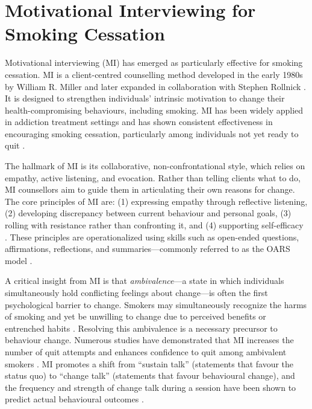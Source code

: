 \section{Motivational Interviewing for Smoking Cessation}

Motivational interviewing (MI) has emerged as particularly effective for smoking cessation. MI is a client-centred counselling method developed in the early 1980s by William R. Miller and later expanded in collaboration with Stephen Rollnick \cite{miller1991motivational,MillerRollnick2023}. It is designed to strengthen individuals' intrinsic motivation to change their health-compromising behaviours, including smoking. MI has been widely applied in addiction treatment settings and has shown consistent effectiveness in encouraging smoking cessation, particularly among individuals not yet ready to quit \cite{bischof2021evidence,doi:10.1177/1049731509347850}.

The hallmark of MI is its collaborative, non-confrontational style, which relies on empathy, active listening, and evocation. Rather than telling clients what to do, MI counsellors aim to guide them in articulating their own reasons for change. The core principles of MI are: (1) expressing empathy through reflective listening, (2) developing discrepancy between current behaviour and personal goals, (3) rolling with resistance rather than confronting it, and (4) supporting self-efficacy \cite{rollnick2008motivational}. These principles are operationalized using skills such as open-ended questions, affirmations, reflections, and summaries---commonly referred to as the OARS model \cite{Miller_2023}.


A critical insight from MI is that \emph{ambivalence}---a state in which individuals simultaneously hold conflicting feelings about change---is often the first psychological barrier to change. Smokers may simultaneously recognize the harms of smoking and yet be unwilling to change due to perceived benefits or entrenched habits \cite{brown2023mi}. Resolving this ambivalence is a necessary precursor to behaviour change. Numerous studies have demonstrated that MI increases the number of quit attempts and enhances confidence to quit among ambivalent smokers \cite{Abar2013, Gwaltney2009-wj}. MI promotes a shift from ``sustain talk'' (statements that favour the status quo) to ``change talk'' (statements that favour behavioural change), and the frequency and strength of change talk during a session have been shown to predict actual behavioural outcomes \cite{Apodaca2009}.

